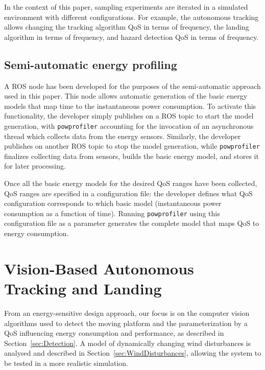 \documentclass[conference]{IEEEtran}
\newcommand{\stt}[1]{{\small\tt #1}} %
\newcommand{\powprof}{\stt{powprofiler}}
\begin{document}
In the context of this paper, sampling experiments are iterated in a
simulated environment with different configurations.  For example, the
autonomous tracking allows changing the tracking algorithm QoS in
terms of frequency, the landing algorithm in terms of frequency, and
hazard detection QoS in terms of frequency.
%


\subsection{Semi-automatic energy profiling}
\label{sec:semi-automatic}
A ROS node has been developed for the purposes of the semi-automatic %
approach used in this paper. This node allows automatic
generation of the basic energy models that map time to the
instantaneous power consumption. To activate this functionality, the developer simply publishes on a ROS
topic to start the model generation, with \powprof{} accounting for
the invocation of an asynchronous thread which collects data from the
energy sensors. Similarly, the developer publishes on another ROS topic to
stop the model generation, while \powprof{} finalizes collecting data from
sensors, builds the basic energy model, and stores it for later processing.

Once all the basic energy models for the desired QoS ranges have been
collected, QoS ranges are specified in a configuration file: the developer defines
what QoS configuration corresponds to which basic model
(instantaneous power consumption as a function of time). Running
\powprof{} using this configuration file as a parameter generates the
complete model that maps QoS to energy consumption.
%
\section{Vision-Based Autonomous Tracking and Landing}
\label{sec:landing}

From an energy-sensitive design
approach, our focus is on the computer vision algorithms used to
detect the moving platform and the parameterization by a QoS
influencing energy consumption and performance, as described in
Section~\ref{sec:Detection}. 
A model of
dynamically changing wind disturbances is analysed and described in
Section~\ref{sec:WindDisturbances}, allowing the system to be tested
in a more realistic simulation.
\end{document}

